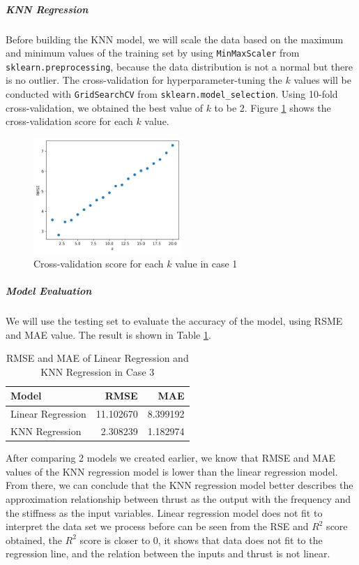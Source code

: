 \documentclass[conf]{new-aiaa}
\begin{document}
\subparagraph{KNN Regression}
Before building the KNN model, we will scale the data based on the maximum and minimum values of the training set by using \texttt{MinMaxScaler} from \texttt{sklearn.preprocessing}, because the data distribution is not a normal but there is no outlier. The cross-validation for hyperparameter-tuning the $k$ values will be conducted with \texttt{GridSearchCV} from \texttt{sklearn.model\_selection}. Using 10-fold cross-validation, we obtained the best value of $k$ to be 2. Figure \ref{fig:case1_knn_rmse} shows the cross-validation score for each $k$ value. 
\begin{figure}[H]
    \centering
    \includegraphics[width=0.5\textwidth]{graph/case1_knn_rmse.png}
    \caption{\label{fig:case1_knn_rmse} Cross-validation score for each $k$ value in case 1}
\end{figure}

\subparagraph{Model Evaluation}
We will use the testing set to evaluate the accuracy of the model, using RSME and MAE value. The result is shown in Table \ref{tab:case1_model_eval}.
\begin{table}[H]
    \centering
    \caption{\label{tab:case1_model_eval} RMSE and MAE of Linear Regression and KNN Regression in Case 3}
    \begin{tabular}{lrr}
        \toprule
        Model &      RMSE &       MAE \\
        \midrule
        Linear Regression &  11.102670 &  8.399192 \\
        KNN Regression    &  2.308239 &  1.182974 \\
        \bottomrule
    \end{tabular}
\end{table}

After comparing 2 models we created earlier, we know that RMSE and MAE values of the KNN regression model is lower than the linear regression model. From there, we can conclude that the KNN regression model better describes the approximation relationship between thrust as the output with the frequency and the stiffness as the input variables. 
Linear regression model does not fit to interpret the data set we process before can be seen from the RSE and $R^2$ score obtained, the $R^2$ score is closer to 0, it shows that data does not fit to the regression line, and the relation between the inputs and thrust is not linear.
\end{document}
